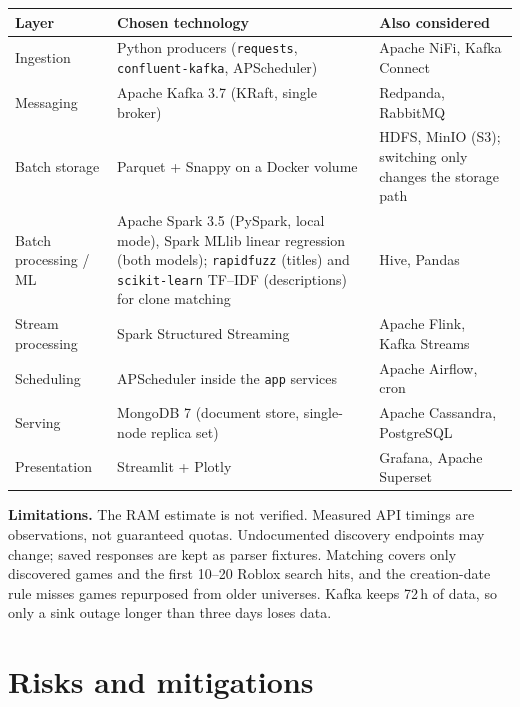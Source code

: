 \documentclass[10pt,a4paper]{article}
\newcommand{\ep}[1]{\texttt{\small #1}}
\begin{document}
\begin{table}[H]
\centering\small
\begin{tabularx}{\textwidth}{L{2.8cm} Y L{4.4cm}}
\toprule
\textbf{Layer} & \textbf{Chosen technology} & \textbf{Also considered}\\
\midrule
Ingestion & Python producers (\ep{requests}, \ep{confluent-kafka}, APScheduler) & Apache NiFi, Kafka Connect\\
Messaging & Apache Kafka 3.7 (KRaft, single broker) & Redpanda, RabbitMQ\\
Batch storage & Parquet + Snappy on a Docker volume & HDFS, MinIO (S3); switching only changes the storage path\\
Batch processing / ML & Apache Spark 3.5 (PySpark, local mode), Spark MLlib linear regression (both models); \ep{rapidfuzz} (titles) and \ep{scikit-learn} TF--IDF (descriptions) for clone matching & Hive, Pandas\\
Stream processing & Spark Structured Streaming & Apache Flink, Kafka Streams\\
Scheduling & APScheduler inside the \ep{app} services & Apache Airflow, cron\\
Serving & MongoDB 7 (document store, single-node replica set) & Apache Cassandra, PostgreSQL\\
Presentation & Streamlit + Plotly & Grafana, Apache Superset\\
\bottomrule
\end{tabularx}
\end{table}

\textbf{Limitations.} The RAM estimate is not verified. Measured API timings are observations, not guaranteed quotas. Undocumented discovery endpoints may change; saved responses are kept as parser fixtures. Matching covers only discovered games and the first 10--20 Roblox search hits, and the creation-date rule misses games repurposed from older universes. Kafka keeps 72\,h of data, so only a sink outage longer than three days loses data.

\section{Risks and mitigations}
\end{document}
